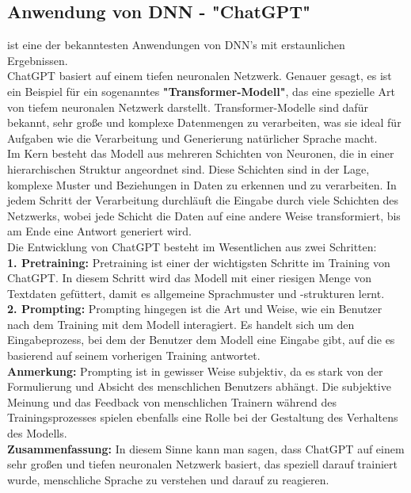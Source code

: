 \documentclass[12pt]{article}
\begin{document}
\subsection{Anwendung von DNN - "ChatGPT"}
%
{\color{blue}{ChatGPT}} ist eine der bekanntesten Anwendungen von DNN's mit erstaunlichen Ergebnissen.\\
ChatGPT basiert auf einem tiefen neuronalen Netzwerk. Genauer gesagt, es ist ein Beispiel für ein sogenanntes \textbf{"Transformer-Modell"}, das eine spezielle Art von tiefem neuronalen Netzwerk darstellt. Transformer-Modelle sind dafür bekannt, sehr große und komplexe Datenmengen zu verarbeiten, was sie ideal für Aufgaben wie die Verarbeitung und Generierung natürlicher Sprache macht.\\
Im Kern besteht das Modell aus mehreren Schichten von Neuronen, die in einer hierarchischen Struktur angeordnet sind. Diese Schichten sind in der Lage, komplexe Muster und Beziehungen in Daten zu erkennen und zu verarbeiten. In jedem Schritt der Verarbeitung durchläuft die Eingabe durch viele Schichten des Netzwerks, wobei jede Schicht die Daten auf eine andere Weise transformiert, bis am Ende eine Antwort generiert wird.\\[0.3cm]
Die Entwicklung von ChatGPT besteht im Wesentlichen aus zwei Schritten:\\[0.2cm]
%
\textbf{1. Pretraining:} Pretraining ist einer der wichtigsten Schritte im Training von ChatGPT. In diesem Schritt wird das Modell mit einer riesigen Menge von Textdaten gefüttert, damit es allgemeine Sprachmuster und -strukturen lernt. \\
%
\textbf{2. Prompting:} Prompting hingegen ist die Art und Weise, wie ein Benutzer nach dem Training mit dem Modell interagiert. Es handelt sich um den Eingabeprozess, bei dem der Benutzer dem Modell eine Eingabe gibt, auf die es basierend auf seinem vorherigen Training antwortet.\\
%
\textbf{Anmerkung:} Prompting ist in gewisser Weise subjektiv, da es stark von der Formulierung und Absicht des menschlichen Benutzers abhängt. Die subjektive Meinung und das Feedback von menschlichen Trainern während des Trainingsprozesses spielen ebenfalls eine Rolle bei der Gestaltung des Verhaltens des Modells.\\[0.3cm]
%
\textbf{Zusammenfassung:} In diesem Sinne kann man sagen, dass ChatGPT auf einem sehr großen und tiefen neuronalen Netzwerk basiert, das speziell darauf trainiert wurde, menschliche Sprache zu verstehen und darauf zu reagieren.
\end{document}
